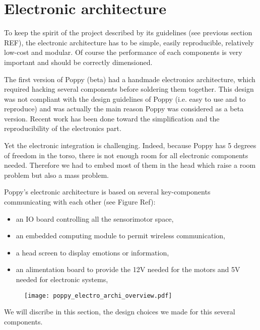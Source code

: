 
\section{Electronic architecture} %
\label{sec:poppy-electronic}

To keep the spirit of the project described by its guidelines (see previous section REF), the electronic architecture has to be simple, easily reproducible, relatively low-cost and modular. Of course the performance of each components is very important and should be correctly dimensioned.

The first version of Poppy (beta) had a handmade electronics architecture, which required hacking several components before soldering them together. This design was not compliant with the design guidelines of Poppy (i.e. easy to use and to reproduce) and was actually the main reason Poppy was considered as a beta version. Recent work has been done toward the simplification and the reproducibility of the electronics part.

Yet the electronic integration is challenging. Indeed, because Poppy has 5 degrees of freedom in the torso, there is not enough room for all electronic components needed. Therefore we had to embed most of them in the head which raise a room problem but also a mass problem.


Poppy's electronic architecture is based on several key-components communicating with each other (see Figure Ref):
\begin{itemize}
    \item an IO board controlling all the sensorimotor space,
    \item an embedded computing module to permit wireless communication,
    \item a head screen to display emotions or information,
    \item an alimentation board to provide the 12V needed for the motors and 5V needed for electronic systems,
\end{itemize}

\begin{figure}[tb]
    \begin{center}
        \texttt{[image: poppy\_electro\_archi\_overview.pdf]}
    \end{center}
    \caption{}

\end{figure}

We will discribe in this section, the design choices we made for this several components.

